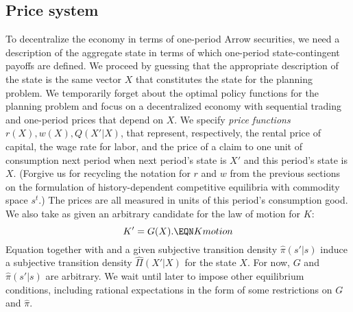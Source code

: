 \subsection{Price system}
To decentralize the economy in terms of one-period Arrow securities,
we need a description of the aggregate state in terms of which one-period
state-contingent payoffs are defined.  We proceed by guessing that the
appropriate description of the state is the same vector $X$ that
constitutes the state for the planning problem.  We temporarily forget
about the optimal policy functions for the planning problem and focus
on a decentralized economy with sequential trading and one-period
prices that depend on $X$. We specify {\it price functions\/}
$r(X), w(X), Q(X'|X)$, that represent, respectively, the rental price
of capital, the wage rate for labor, and the price of a claim to one
unit of consumption next period when next period's state is $X'$ and
this period's state is $X$.
(Forgive us for recycling the notation
for $r$ and $w$ from the previous sections on the formulation of
history-dependent competitive equilibria with commodity space
$s^t$.)
The prices are
all measured in units of this period's consumption good.
We also take as given an arbitrary candidate for the law of
motion for $K$:
$$ K' = G(X). \EQN Kmotion $$
Equation   together with  and a given
subjective transition
density $\hat \pi(s'|s)$ induce a subjective transition
density $\hat \Pi(X' |X)$ for the state $X$.
For now, $G$ and $\hat \pi(s'|s)$ are arbitrary. We wait until
later to impose other equilibrium conditions, including rational
expectations in the form of some restrictions on $G$ and $\hat \pi$.


